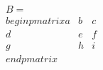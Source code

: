 \documentclass[preview]{standalone}
\begin{document}
\begin{align*}
B = \\begin{pmatrix} a & b & c \\ d & e & f \\ g & h & i \\end{pmatrix}
\end{align*}
\end{document}
